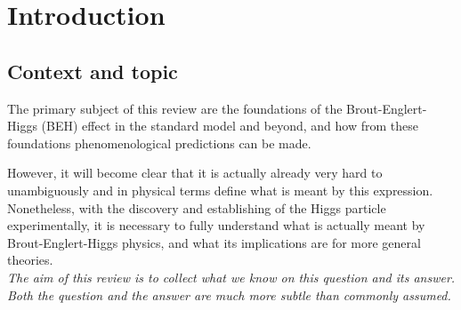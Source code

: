 \documentclass[final,twoside,12pt]{article}
\newcommand*{\1}{1\!\!\!\bot}
\begin{document}

\setcounter{secnumdepth}{4}
\setcounter{tocdepth}{4}
\tableofcontents
\newpage
{}

\section{Introduction}\label{sintro}

\subsection{Context and topic}

The primary subject of this review are the foundations of the Brout-Englert-Higgs (BEH) effect \cite{Englert:1964et,Higgs:1964pj,Higgs:1964ia,Higgs:1966ev,Guralnik:1964eu,Kibble:1967sv,Englert:1966uea} in the standard model and beyond, and how from these foundations phenomenological predictions can be made.

However, it will become clear that it is actually already very hard to unambiguously and in physical terms define what is meant by this expression. Nonetheless, with the discovery \cite{Aad:2012tfa,Chatrchyan:2012ufa} and establishing \cite{pdg,Khachatryan:2016vau} of the Higgs particle experimentally, it is necessary to fully understand what is actually meant by Brout-Englert-Higgs physics, and what its implications are for more general theories.\\[0.5mm]

{\em The aim of this review is to collect what we know on this question and its answer. Both the question and the answer are much more subtle than commonly assumed.}\\[0.5mm]
\end{document}
